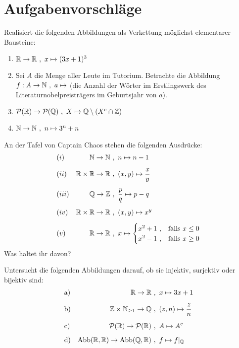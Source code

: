 \clearpage
\section{Aufgabenvorschläge}


\begin{aufg}
    Realisiert die folgenden Abbildungen als Verkettung möglichst elementarer Bausteine:
    \begin{enumerate}
        \item $\mathbb R\to \mathbb R \ ,\ x\mapsto (3x+1)^3$
        \item Sei $A$ die Menge aller Leute im Tutorium. Betrachte die Abbildung $f:A\to \mathbb N \ ,\ a\mapsto$ (die Anzahl der Wörter im Erstlingswerk des Literaturnobelpreisträgers im Geburtsjahr von $a$).
        \item $\mathcal P(\mathbb R) \to \mathcal P(\mathbb Q) \ ,\ X \mapsto \mathbb Q \setminus (X^c\cap \mathbb Z)$
        \item $\mathbb N \to \mathbb N \ ,\ n \mapsto 3^n + n$
    \end{enumerate}
\end{aufg}


\begin{aufg}[Wohldefiniertheit] \label{aufg:wohldef}
    An der Tafel von Captain Chaos stehen die folgenden Ausdrücke:
    \begin{align*}
        & (i) & \mathbb N \to \mathbb N\ &,\ n \mapsto n-1 \\[0.5em]
        & (ii) & \mathbb R\times \mathbb R \to \mathbb R \ &,\ (x,y) \mapsto \frac{x}{y} \\[0.5em]
        & (iii) & \mathbb Q \to \mathbb Z \ &,\ \frac{p}{q} \mapsto p-q \\[0.5em]
        & (iv) & \mathbb R \times \mathbb R \to \mathbb R \ &,\ (x,y) \mapsto x^y \\[0.5em]
        & (v) & \mathbb R \to \mathbb R \ &,\ x \mapsto \begin{cases}
            x^2+1\ , & \text{falls}\ x \le 0 \\
            x^2-1\ , & \text{falls}\ x\ge 0
        \end{cases}
    \end{align*}
    Was haltet ihr davon?
\end{aufg}


\begin{aufg}
    Untersucht die folgenden Abbildungen darauf, ob sie injektiv, surjektiv oder bijektiv sind:
    \begin{align*}
        & \text{a)} & \mathbb R \to \mathbb R\ &,\ x\mapsto 3x+1 \\[0.5em]
        & \text{b)} & \mathbb Z \times \mathbb N_{\ge 1} \to \mathbb Q\ &,\ (z,n) \mapsto \frac{z}{n} \\[0.5em]
        & \text{c)} & \mathcal P(\mathbb R) \to \mathcal P(\mathbb R) \ &,\ A \mapsto A^c \\[0.5em]
        & \text{d)} & \operatorname{Abb}(\mathbb R,\mathbb R) \to \operatorname{Abb}(\mathbb Q,\mathbb R) \ &,\ f \mapsto f\vert_\mathbb Q
    \end{align*}
\end{aufg}



